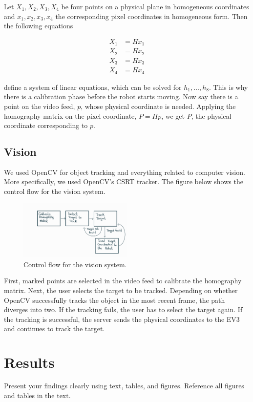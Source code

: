 \documentclass[11pt]{article}
\begin{document}
Let $X_1, X_2, X_3, X_4$ be four points on a physical plane in homogeneous coordinates and $x_1, x_2, x_3, x_4$ the corresponding pixel coordinates in homogeneous form.
Then the following equations

\begin{align*}
X_1 &= Hx_1 \\
X_2 &= Hx_2 \\
X_3 &= Hx_3 \\
X_4 &= Hx_4
\end{align*}

define a system of linear equations, which can be solved for $h_1, \dots, h_8$. This is why there is a calibration phase before the robot starts moving. Now
say there is a point on the video feed, $p$, whose physical coordinate is needed. Applying the homography matrix on the pixel coordinate, $P = Hp$, we get
$P$, the physical coordinate corresponding to $p$.

\subsection{Vision}
We used OpenCV for object tracking and everything related to computer vision. More specifically, we used OpenCV's CSRT
tracker. The figure below shows the control flow for the vision system.

\begin{figure}[h]
\centering
\includegraphics[width=0.5\textwidth]{VisionSystem.jpg}
\caption{Control flow for the vision system.}
\label{fig:figure4}
\end{figure}

First, marked points are selected in the video
feed to calibrate the homography matrix. Next, the user selects the target to be tracked. Depending on whether OpenCV
successfully tracks the object in the most recent frame, the path diverges into two. If the tracking fails, the user has
to select the target again. If the tracking is successful, the server sends the physical coordinates to the EV3 and continues
to track the target.

\section{Results}
Present your findings clearly using text, tables, and figures. Reference all figures and tables in the text.
\end{document}
